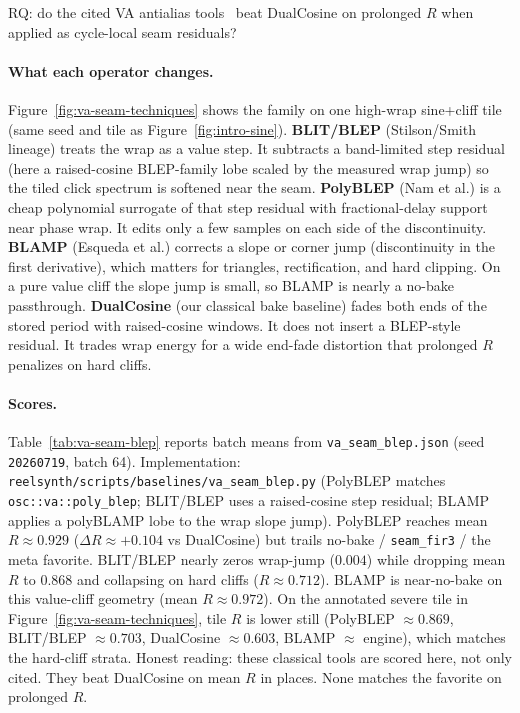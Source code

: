 RQ: do the cited VA antialias tools~\cite{stilson1996,nam2009polyblep,esqueda2016blamp} beat DualCosine on prolonged $R$ when applied as cycle-local seam residuals?

\paragraph{What each operator changes.}
Figure~\ref{fig:va-seam-techniques} shows the family on one high-wrap sine{+}cliff tile (same seed and tile as Figure~\ref{fig:intro-sine}).
\textbf{BLIT/BLEP} (Stilson/Smith lineage) treats the wrap as a value step.
It subtracts a band-limited step residual (here a raised-cosine BLEP-family lobe scaled by the measured wrap jump) so the tiled click spectrum is softened near the seam.
\textbf{PolyBLEP} (Nam et al.) is a cheap polynomial surrogate of that step residual with fractional-delay support near phase wrap.
It edits only a few samples on each side of the discontinuity.
\textbf{BLAMP} (Esqueda et al.) corrects a slope or corner jump (discontinuity in the first derivative), which matters for triangles, rectification, and hard clipping.
On a pure value cliff the slope jump is small, so BLAMP is nearly a no-bake passthrough.
\textbf{DualCosine} (our classical bake baseline) fades both ends of the stored period with raised-cosine windows.
It does not insert a BLEP-style residual.
It trades wrap energy for a wide end-fade distortion that prolonged $R$ penalizes on hard cliffs.

\paragraph{Scores.}
Table~\ref{tab:va-seam-blep} reports batch means from \texttt{va\_seam\_blep.json} (seed \texttt{20260719}, batch 64).
Implementation: \texttt{reelsynth/scripts/baselines/va\_seam\_blep.py} (PolyBLEP matches \texttt{osc::va::poly\_blep}; BLIT/BLEP uses a raised-cosine step residual; BLAMP applies a polyBLAMP lobe to the wrap slope jump).
PolyBLEP reaches mean $R\approx 0.929$ ($\Delta R\approx{+}0.104$ vs DualCosine) but trails no-bake / \texttt{seam\_fir3} / the meta favorite.
BLIT/BLEP nearly zeros wrap-jump ($0.004$) while dropping mean $R$ to $0.868$ and collapsing on hard cliffs ($R\approx 0.712$).
BLAMP is near-no-bake on this value-cliff geometry (mean $R\approx 0.972$).
On the annotated severe tile in Figure~\ref{fig:va-seam-techniques}, tile $R$ is lower still (PolyBLEP $\approx 0.869$, BLIT/BLEP $\approx 0.703$, DualCosine $\approx 0.603$, BLAMP $\approx$ engine), which matches the hard-cliff strata.
Honest reading: these classical tools are scored here, not only cited.
They beat DualCosine on mean $R$ in places.
None matches the favorite on prolonged $R$.

